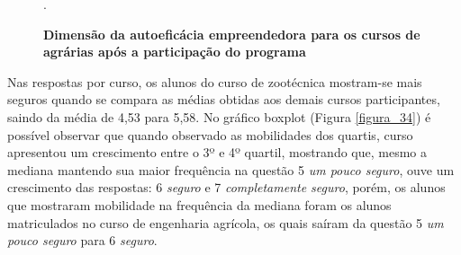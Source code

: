 \begin{figure}[!h]
\center
\caption{\textbf{Dimensão da autoeficácia empreendedora para os cursos de agrárias após a participação do programa}}
\qquad
{}
.
\label{figura_29}
\end{figure}
\newpage


Nas respostas por curso, os alunos do curso de zootécnica mostram-se mais seguros quando se compara as médias obtidas aos demais cursos participantes, saindo da média de 4,53 para 5,58. No gráfico boxplot (Figura \ref{figura_34}) é possível observar que quando observado as mobilidades dos quartis, curso apresentou um crescimento entre o 3º e 4º quartil, mostrando que, mesmo a mediana mantendo sua maior frequência na questão 5 \textit{um pouco seguro}, ouve um crescimento das respostas: 6 \textit{seguro} e 7 \textit{completamente seguro}, porém, os alunos que mostraram mobilidade na frequência da mediana foram os alunos matriculados no curso de engenharia agrícola, os quais saíram da questão 5 \textit{um pouco seguro} para 6 \textit{seguro}. 


